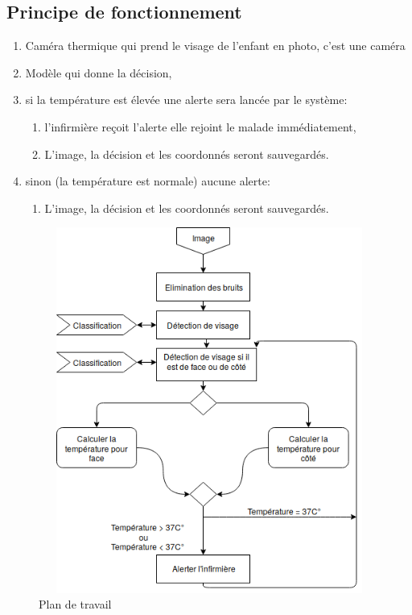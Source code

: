 \documentclass[12pt]{article}
\begin{document}
\subsection{Principe de fonctionnement}
\begin{enumerate}
	\item Caméra thermique qui prend le visage de l’enfant en photo, c'est une caméra 
	\item Modèle qui donne la décision,
	\item si la température est élevée une alerte sera lancée par le système:
	\begin{enumerate}
		\item l’infirmière reçoit l’alerte elle rejoint le malade immédiatement,
		\item L’image, la décision et les coordonnés seront sauvegardés.
	\end{enumerate}
	\item sinon (la température est normale) aucune alerte:
	\begin{enumerate}
		\item L’image, la décision et les coordonnés seront sauvegardés.
	\end{enumerate}
\end{enumerate}
\newpage

\begin{figure}[h]
	\centering
	\includegraphics[height=12cm,width=12cm]{img-Chapiter-3/Picture1.png}
	\caption{Plan de travail}
\end{figure}
\end{document}
